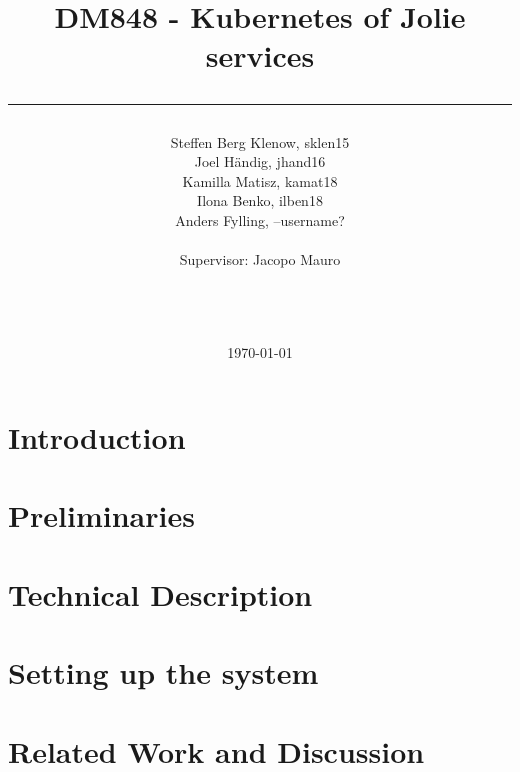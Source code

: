 \documentclass[a4paper,11pt]{article}
\title{DM848 - Kubernetes of Jolie services\\\rule{10cm}{0.5mm}}
\author{Steffen Berg Klenow, sklen15\\ Joel Händig, jhand16\\ Kamilla Matisz, kamat18\\ Ilona Benko, ilben18 \\ Anders Fylling, --username?
\\\\Supervisor: Jacopo Mauro\\\rule{5.5cm}{0.5mm}\\}
\date{\today}
\begin{document}
\clearpage\maketitle
\thispagestyle{empty}

\newpage
\clearpage\tableofcontents
\thispagestyle{empty}

\newpage
\setcounter{page}{1}

\section{Introduction}
	

\section{Preliminaries}
	

\section{Technical Description}
	
	
\section{Setting up the system}
	

\section{Related Work and Discussion}
	
\end{document}
